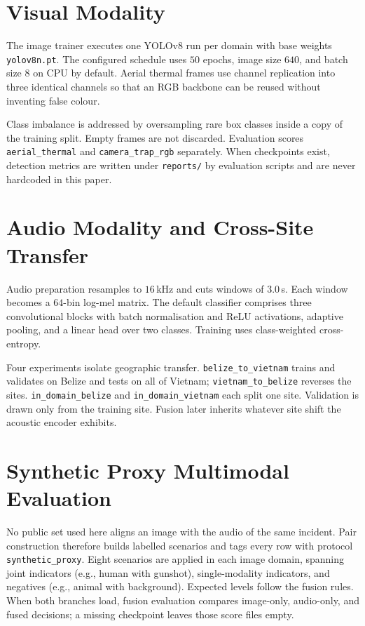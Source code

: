 \documentclass[conference]{IEEEtran}
\begin{document}
\section{Visual Modality}
The image trainer executes one YOLOv8 run per domain with base weights \texttt{yolov8n.pt}. The configured schedule uses $50$ epochs, image size $640$, and batch size $8$ on CPU by default. Aerial thermal frames use channel replication into three identical channels so that an RGB backbone can be reused without inventing false colour.

Class imbalance is addressed by oversampling rare box classes inside a copy of the training split. Empty frames are not discarded. Evaluation scores \texttt{aerial\_thermal} and \texttt{camera\_trap\_rgb} separately. When checkpoints exist, detection metrics are written under \texttt{reports/} by evaluation scripts and are never hardcoded in this paper.

\section{Audio Modality and Cross-Site Transfer}
Audio preparation resamples to $16$\,kHz and cuts windows of $3.0$\,s. Each window becomes a $64$-bin log-mel matrix. The default classifier comprises three convolutional blocks with batch normalisation and ReLU activations, adaptive pooling, and a linear head over two classes. Training uses class-weighted cross-entropy.

Four experiments isolate geographic transfer. \texttt{belize\_to\_vietnam} trains and validates on Belize and tests on all of Vietnam; \texttt{vietnam\_to\_belize} reverses the sites. \texttt{in\_domain\_belize} and \texttt{in\_domain\_vietnam} each split one site. Validation is drawn only from the training site. Fusion later inherits whatever site shift the acoustic encoder exhibits.

\section{Synthetic Proxy Multimodal Evaluation}
No public set used here aligns an image with the audio of the same incident. Pair construction therefore builds labelled scenarios and tags every row with protocol \texttt{synthetic\_proxy}. Eight scenarios are applied in each image domain, spanning joint indicators (e.g., human with gunshot), single-modality indicators, and negatives (e.g., animal with background). Expected levels follow the fusion rules. When both branches load, fusion evaluation compares image-only, audio-only, and fused decisions; a missing checkpoint leaves those score files empty.
\end{document}

